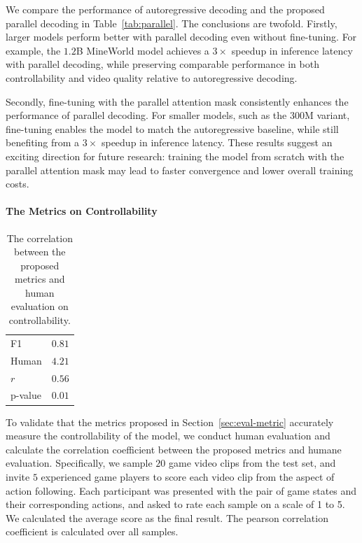 \documentclass{article} %
\begin{document}
We compare the performance of autoregressive decoding and the proposed parallel decoding in Table~\ref{tab:parallel}. The conclusions are twofold. Firstly, larger models perform better with parallel decoding even without fine-tuning. For example, the $1.2$B MineWorld model achieves a $3\times$ speedup in inference latency with parallel decoding, while preserving comparable performance in both controllability and video quality relative to autoregressive decoding.

Secondly, fine-tuning with the parallel attention mask consistently enhances the performance of parallel decoding. For smaller models, such as the $300$M variant, fine-tuning enables the model to match the autoregressive baseline, while still benefiting from a $3\times$ speedup in inference latency. These results suggest an exciting direction for future research: training the model from scratch with the parallel attention mask may lead to faster convergence and lower overall training costs.

\paragraph{The Metrics on Controllability}

\begin{table}
    \centering    
    \caption{The correlation between the proposed metrics and human evaluation on controllability.} 
    \begin{tabular}{l|c}
    \toprule
      F1  & $0.81$ \\    
      Human  & $4.21$ \\
      $r$ & $0.56$ \\
      p-value & $0.01$ \\
    \bottomrule  
    \end{tabular}       
    \label{tab:correlation}
\end{table}

To validate that the metrics proposed in Section~\ref{sec:eval-metric} accurately measure the controllability of the model, we conduct human evaluation and calculate the correlation coefficient between the proposed metrics and humane evaluation. Specifically, we sample $20$ game video clips from the test set, and invite $5$ experienced game players to score each video clip from the aspect of action following. Each participant was presented with the pair of game states and their corresponding actions, and asked to rate each sample on a scale of 1 to 5. We calculated the average score as the final result. The pearson correlation coefficient is calculated over all samples.
\end{document}
